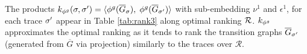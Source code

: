 \begin{example}%
	The products $k_{{\phi^{g}}}(\sigma,{\sigma'})=\braket{{\phi^{g}}(\overline{G}_\sigma),\;{\phi^{g}}(\overline{G}_{{\sigma'}})}$
	with sub-embedding $\nu^1$ and $\epsilon^1$, for each trace ${\sigma'}$ appear in
	Table \ref{tab:rank3} along optimal ranking $\mathcal{R}$. $k_{{\phi^{g}}}$ approximates the optimal ranking as it tends to rank the transition graphs $\overline{G}_{\sigma'}$ (generated from $\overline{G}$ via projection) similarly to the traces over $\mathcal{R}$.
\end{example}
%
%	
